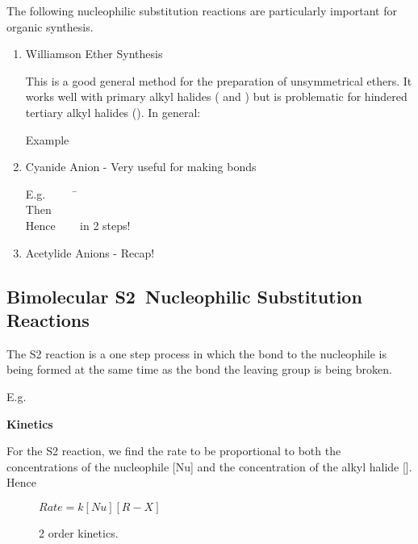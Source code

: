 The following nucleophilic substitution reactions are particularly important
for organic synthesis.

\begin{enumerate}[label=\alph*)]

  \item Williamson Ether Synthesis

    This is a good general method for the preparation of unsymmetrical ethers.
    It works well with primary alkyl halides ( and ) but
    is problematic for hindered tertiary alkyl halides (). In general:


    Example


  \item Cyanide Anion - Very useful for making  bonds

    \begin{tabbing}
      E.g.~~~~~ \=  \\
      Then \>  \\
      Hence \>  ~~~ in 2 steps!
    \end{tabbing}

  \item Acetylide Anions - Recap!

\end{enumerate}

\subsection{Bimolecular \texorpdfstring{S2}\ \ Nucleophilic Substitution Reactions}

The S2 reaction is a one step process in which the bond to the nucleophile
is being formed at the same time as the bond the leaving group is being broken.


E.g.


\textbf{Kinetics}

For the S2 reaction, we find the rate to be proportional to both the
concentrations of the nucleophile [Nu] and the concentration of the alkyl halide
[]. Hence

\begin{figure}[H]
  \centering
  $Rate = k[Nu][R-X]$
  \caption*{2 order kinetics.}
\end{figure}

